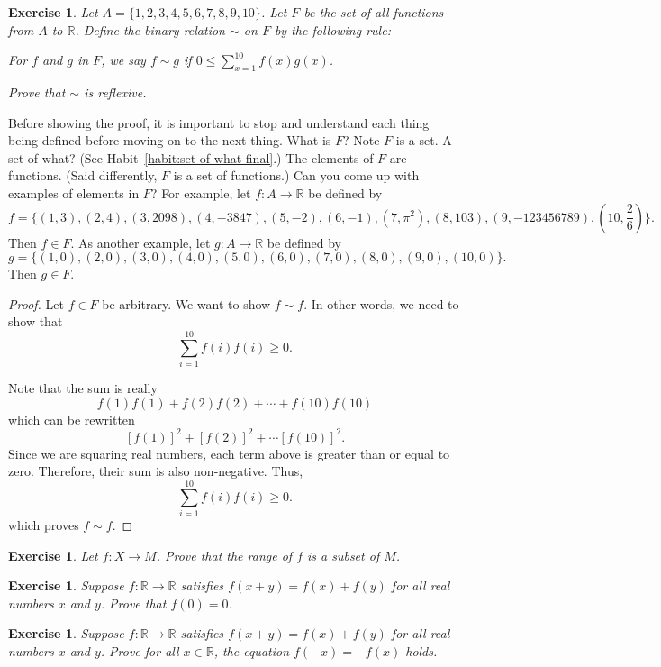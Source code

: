 \documentclass{book}
\newcounter{ekcounter}%
\theoremstyle{ekimcustom}
\newtheorem{exercise}[ekcounter]{Exercise}
\begin{document}
\begin{exercise}
Let $A=\{1,2,3,4,5,6,7,8,9,10\}$. Let $F$ be the set of all functions from $A$ to $\mathbb{R}$. Define the binary relation $\sim$ on $F$ by the following rule:
\begin{center}
    For $f$ and $g$ in $F$, we say $f \sim g$ if $0 \leq \displaystyle \sum_{x=1}^{10} f(x)g(x)$.
\end{center}
Prove that $\sim$ is reflexive.
\end{exercise}
Before showing the proof, it is important to stop and understand each thing being defined before moving on to the next thing. What is $F$? Note $F$ is a set. A set of what? (See Habit~\ref{habit:set-of-what-final}.) The elements of $F$ are functions. (Said differently, $F$ is a set of functions.) Can you come up with examples of elements in $F$?
For example, let $f : A \to \mathbb{R}$ be defined by
\[f = \{(1,3),(2,4),(3,2098),(4,-3847),(5,-2),(6,-1),(7,\pi^2),(8,103),(9,-123456789),(10,\textstyle\frac26)\}.\]
Then $f \in F$.
As another example, let $g : A \to \mathbb{R}$ be defined by
\[g = \{(1,0),(2,0),(3,0),(4,0),(5,0),(6,0),(7,0),(8,0),(9,0),(10,0)\}.\]
Then $g \in F$.
\begin{proof}
Let $f \in F$ be arbitrary. We want to show $f \sim f$. In other words, we need to show that
\[ \sum_{i=1}^{10} f(i)f(i) \geq 0.\]

Note that the sum is really
\[ f(1)f(1) + f(2)f(2) + \cdots + f(10)f(10)\]
which can be rewritten
\[ [f(1)]^2 + [f(2)]^2+ \cdots [f(10)]^2.\]
Since we are squaring real numbers, each term above is greater than or equal to zero. Therefore, their sum is also non-negative. Thus,
\[ \sum_{i=1}^{10} f(i)f(i) \geq 0.\]
which proves $f \sim f$.
\end{proof}

\begin{exercise}
Let $f : X \to M$. Prove that the range of $f$ is a subset of $M$.%
\end{exercise}

\begin{exercise}
Suppose $f : \mathbb{R} \to \mathbb{R}$ satisfies $f(x+y)=f(x)+f(y)$ for all real numbers $x$ and $y$. Prove that $f(0)=0$.%
\end{exercise}

\begin{exercise}
Suppose $f : \mathbb{R} \to \mathbb{R}$ satisfies $f(x+y)=f(x)+f(y)$ for all real numbers $x$ and $y$. Prove for all $x \in \mathbb{R}$, the equation $f(-x)=-f(x)$ holds.%
\end{exercise}
\end{document}
